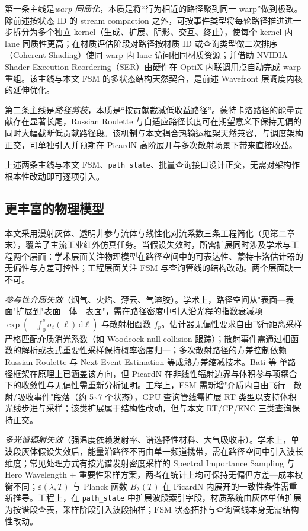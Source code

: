 第一条主线是\emph{warp 同质化}，本质是将“行为相近的路径聚到同一 warp”做到极致。除前述按状态 ID 的 stream compaction 之外，可按事件类型将每轮路径推进进一步拆分为多个独立 kernel（生成、扩展、阴影、交互、终止），使每个 kernel 内 lane 同质性更高；在材质评估阶段对路径按材质 ID 或查询类型做二次排序（Coherent Shading）使同 warp 内 lane 访问相同材质资源；并借助 NVIDIA Shader Execution Reordering（SER）由硬件在 OptiX 内联调用点自动完成 warp 重组。该主线与本文 FSM 的多状态结构天然契合，是前述 Wavefront 层调度内核的延伸优化。

第二条主线是\emph{路径剪枝}，本质是“按贡献裁减低收益路径”。蒙特卡洛路径的能量贡献存在显著长尾，Russian Roulette 与自适应路径长度可在期望意义下保持无偏的同时大幅截断低贡献路径段。该机制与本文耦合热输运框架天然兼容，与调度架构正交，可单独引入并预期在 PicardN 高阶展开与多次散射场景下带来直接收益。

上述两条主线与本文 FSM、\texttt{path\_state}、批量查询接口设计正交，无需对架构作根本性改动即可逐项引入。

\subsection{ 更丰富的物理模型 }本文采用漫射灰体、透明非参与流体与线性化对流系数三条工程简化（见第二章末），覆盖了主流工业红外仿真任务。当假设失效时，所需扩展同时涉及学术与工程两个层面：学术层面关注物理模型在路径空间中的可表达性、蒙特卡洛估计器的无偏性与方差可控性；工程层面关注 FSM 与查询管线的结构改动。两个层面缺一不可。

\emph{参与性介质失效}（烟气、火焰、薄云、气溶胶）。学术上，路径空间从"表面—表面"扩展到"表面—体—表面"，需在路径密度中引入沿光程的指数衰减项 $\exp(-\!\int_0^s \sigma_t(\ell)\,\mathrm d\ell)$ 与散射相函数 $f_p$。估计器无偏性要求自由飞行距离采样严格匹配介质消光系数（如 Woodcock null-collision 跟踪）；散射事件需通过相函数的解析或表式重要性采样保持概率密度归一；多次散射路径的方差控制依赖 Russian Roulette 与 Next-Event Estimation 等成熟方差缩减技术。Bati 等\cite{batiCouplingConductionConvection2023} 单路径框架在原理上已涵盖该方向，但 PicardN 在非线性辐射边界与体积参与项耦合下的收敛性与无偏性需重新分析证明。工程上，FSM 需新增"介质内自由飞行—散射/吸收事件"段落（约 5\textasciitilde 7 个状态），GPU 查询管线需扩展 RT 类型以支持体积光线步进与采样；该类扩展属于结构性改动，但与本文 RT/CP/ENC 三类查询保持正交。

\emph{多光谱辐射失效}（强温度依赖发射率、谱选择性材料、大气吸收带）。学术上，单波段灰体假设失效后，能量沿路径不再由单一频道携带，需在路径空间中引入波长维度；常见处理方式有按光谱发射密度采样的 Spectral Importance Sampling 与 Hero Wavelength + 重要性采样方案，两者在统计上均可保持无偏但方差—成本权衡不同；$\varepsilon(\lambda,T)$ 与 Planck 函数 $B_\lambda(T)$ 在 PicardN 内展开的一致性条件需重新推导。工程上，在 \texttt{path\_state} 中扩展波段索引字段，材质系统由灰体单值扩展为按谱段查表，采样阶段引入波段抽样；FSM 状态拓扑与查询管线本身无需结构性改动。

